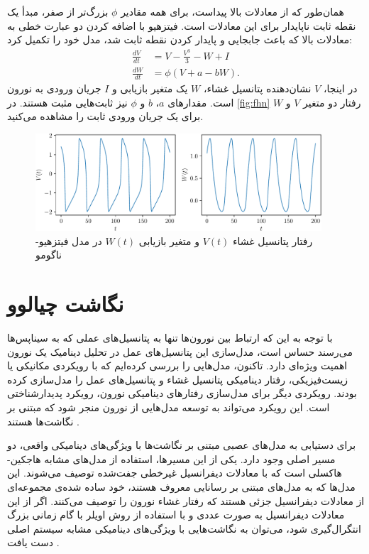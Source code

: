 همان‌طور که از معادلات بالا پیداست، برای همه مقادیر
\( \phi \)
بزرگ‌تر از صفر، مبدأ یک نقطه ثابت ناپایدار برای این معادلات است.
فیتزهیو با اضافه کردن دو عبارت خطی به معادلات بالا که باعث جابجایی و پایدار کردن نقطه ثابت شد، مدل خود را تکمیل کرد:
\begin{subequations}
    \begin{align}
        \frac{dV}{dt} & = V - \frac{V^3}{3} - W + I \\
        \frac{dW}{dt} & = \phi(V + a - bW).
    \end{align}
\end{subequations}
در اینجا،
\( V \)
نشان‌دهنده پتانسیل غشاء،
\( W \)
یک متغیر بازیابی و
\( I \)
جریان ورودی به نورون است.
مقدارهای
\( a \)، \( b \) و \( \phi \)
نیز ثابت‌هایی مثبت هستند.
در
\autoref{fig:fhn}
رفتار دو متغیر
\( V \) و \( W \)
برای یک جریان ورودی ثابت را مشاهده می‌کنید.

\begin{figure}[!ht]
    \centering
    \includegraphics[width=0.95\textwidth]{figures/FHN}
    \caption{رفتار پتانسیل غشاء
        \( V(t) \)
        و متغیر بازیابی
        \( W(t) \)
        در مدل فیتزهیو-ناگومو}
    \label{fig:fhn}
\end{figure}

\section{نگاشت چیالوو}
با توجه به این که ارتباط بین نورون‌ها تنها به پتانسیل‌های عملی که به سیناپس‌ها می‌رسند حساس است، مدل‌سازی این پتانسیل‌های عمل در تحلیل دینامیک یک نورون اهمیت ویژه‌ای دارد.
تاکنون، مدل‌هایی را بررسی کرده‌ایم که با رویکردی مکانیکی یا زیست‌فیزیکی، رفتار دینامیکی پتانسیل غشاء و پتانسیل‌های عمل را مدل‌سازی کرده بودند.
رویکردی دیگر برای مدل‌سازی رفتارهای دینامیکی نورون، رویکرد پدیدارشناختی است.
این رویکرد می‌تواند به توسعه مدل‌هایی از نورون منجر شود که مبتنی بر نگاشت‌ها هستند
\cite{girardi-schappo2013}.

برای دستیابی به مدل‌های عصبی مبتنی بر نگاشت‌ها با ویژگی‌های دینامیکی واقعی، دو مسیر اصلی وجود دارد.
یکی از این مسیرها، استفاده از مدل‌های مشابه هاجکین-هاکسلی است که با معادلات دیفرانسیل غیرخطی جفت‌شده توصیف می‌شوند.
این مدل‌ها که به مدل‌های مبتنی بر رسانایی معروف هستند، خود ساده شده‌ی مجموعه‌ای از معادلات دیفرانسیل جزئی هستند که رفتار غشاء نورون را توصیف می‌کنند.
اگر از این معادلات دیفرانسیل به صورت عددی و با استفاده از روش اویلر با گام زمانی بزرگ انتگرال‌گیری شود، می‌توان به نگاشت‌هایی با ویژگی‌های دینامیکی مشابه سیستم اصلی دست یافت
\cite{ibarz2011,girardi-schappo2013}.

